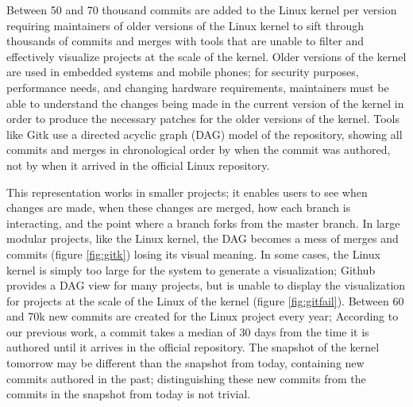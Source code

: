\documentclass[conference, draftclsnofoot, draft]{IEEEtran}
\begin{document}



Between 50 and 70 thousand commits are added to the Linux kernel per version
requiring maintainers of older versions of the Linux kernel to sift through
thousands of commits and merges with tools that are unable to filter and effectively
visualize projects at the scale of the kernel. Older versions of the kernel are used
in embedded systems and mobile phones; for security purposes, performance needs, and
changing hardware requirements, maintainers must be able to understand the changes
being made in the current version of the kernel in order to produce the necessary
patches for the older versions of the kernel. Tools like Gitk use a directed acyclic
graph (DAG) model of the repository, showing all commits and merges in chronological
order by when the commit was authored, not by when it arrived in the official Linux
repository.

This representation works in smaller projects; it enables users to see when changes
are made, when these changes are merged, how each branch is interacting, and the
point where a branch forks from the master branch. In large modular projects, like
the Linux kernel, the DAG becomes a mess of merges and commits (figure
\ref{fig:gitk}) losing its visual meaning. In some cases, the Linux kernel is simply
too large for the system to generate a visualization; Github provides a DAG view for
many projects, but is unable to display the visualization for projects at the scale
of the Linux of the kernel (figure \ref{fig:gitfail}).  Between 60 and 70k new
commits are created for the Linux project every year; According to our previous
work\cite{German2015}, a commit takes a median of 30 days from the time it is
authored until it arrives in the official repository. The snapshot of the kernel
tomorrow may be different than the snapshot from today, containing new commits
authored in the past; distinguishing these new commits from the commits in the
snapshot from today is not trivial.
\end{document}
